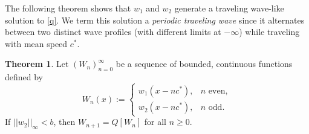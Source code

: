 \documentclass[11pt]{article}
\theoremstyle{definition}
\newtheorem{thm}{Theorem}
\numberwithin{equation}{section}
\numberwithin{thm}{section}
\newcommand{\wone}{w_1}
\newcommand{\wtwo}{w_2}
\newcommand{\w}{W}
\renewcommand{\b}{b}
\begin{document}
The following theorem shows that $\wone$ and $\wtwo$ generate a traveling wave-like solution to \eqref{q}. We term this solution a {\it periodic traveling wave} since it alternates between two distinct wave profiles (with different limits at $-\infty$) while traveling with mean speed $c^*$.

\begin{thm} \label{theorem1} 
Let $(\w_n)_{n=0}^{\infty}$ be a sequence of bounded, continuous functions defined by
\begin{equation}\label{ptw}
\w_n(x) := \begin{cases}
\wone(x-nc^*), & n \text{ even}, \\
\wtwo(x-nc^*), & n \text{ odd}.
\end{cases}
\end{equation}
If $||w_2||_\infty < \b$, then $\w_{n+1}=Q[\w_n]$ for all $n\geq0$.
\end{thm}
\end{document}
